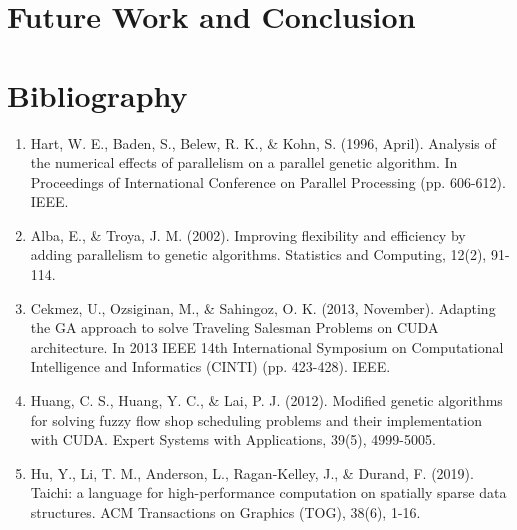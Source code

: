 \documentclass[conference]{IEEEtran}
\begin{document}
\section{Future Work and Conclusion}

\section{Bibliography}

\begin{enumerate}
    \item Hart, W. E., Baden, S., Belew, R. K., \& Kohn, S. (1996, April). Analysis of
          the numerical effects of parallelism on a parallel genetic algorithm. In
          Proceedings of International Conference on Parallel Processing (pp. 606-612).
          IEEE.
    \item Alba, E., \& Troya, J. M. (2002). Improving flexibility and efficiency by
          adding parallelism to genetic algorithms. Statistics and Computing, 12(2),
          91-114.
    \item Cekmez, U., Ozsiginan, M., \& Sahingoz, O. K. (2013, November). Adapting the GA
          approach to solve Traveling Salesman Problems on CUDA architecture. In 2013
          IEEE 14th International Symposium on Computational Intelligence and Informatics
          (CINTI) (pp. 423-428). IEEE.
    \item Huang, C. S., Huang, Y. C., \& Lai, P. J. (2012). Modified genetic algorithms
          for solving fuzzy flow shop scheduling problems and their implementation with
          CUDA. Expert Systems with Applications, 39(5), 4999-5005.
    \item Hu, Y., Li, T. M., Anderson, L., Ragan-Kelley, J., \& Durand, F. (2019).
          Taichi: a language for high-performance computation on spatially sparse data
          structures. ACM Transactions on Graphics (TOG), 38(6), 1-16.
\end{enumerate}
\end{document}
